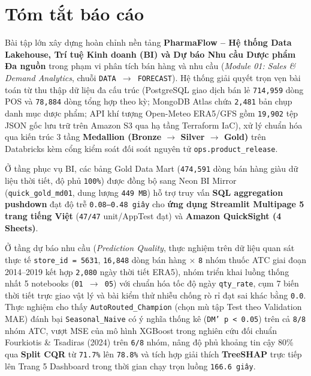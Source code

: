 \chapter*{Tóm tắt báo cáo}

Bài tập lớn xây dựng hoàn chỉnh nền tảng \textbf{PharmaFlow -- Hệ thống Data Lakehouse, Trí tuệ Kinh doanh (BI) và Dự báo Nhu cầu Dược phẩm Đa nguồn} trong phạm vi phân tích bán hàng và nhu cầu (\textit{Module 01: Sales \& Demand Analytics}, chuỗi \texttt{DATA $\rightarrow$ FORECAST}). Hệ thống giải quyết trọn vẹn bài toán từ thu thập dữ liệu đa cấu trúc (PostgreSQL giao dịch bán lẻ \texttt{714,959} dòng POS và \texttt{78,884} dòng tổng hợp theo kỳ; MongoDB Atlas chứa \texttt{2,481} bản chụp danh mục dược phẩm; API khí tượng Open-Meteo ERA5/GFS gồm \texttt{19,902} tệp JSON gốc lưu trữ trên Amazon S3 qua hạ tầng Terraform IaC), xử lý chuẩn hóa qua kiến trúc 3 tầng \textbf{Medallion (Bronze $\rightarrow$ Silver $\rightarrow$ Gold)} trên Databricks kèm cổng kiểm soát đối soát nguyên tử \texttt{ops.product\_release}.

Ở tầng phục vụ BI, các bảng Gold Data Mart (\texttt{474,591} dòng bán hàng giàu dữ liệu thời tiết, độ phủ \texttt{100\%}) được đồng bộ sang Neon BI Mirror (\texttt{quick\_gold\_md01}, dung lượng \texttt{449 MB}) hỗ trợ truy vấn \textbf{SQL aggregation pushdown} đạt độ trễ \texttt{0.08--0.48 giây} cho \textbf{ứng dụng Streamlit Multipage 5 trang tiếng Việt} (\texttt{47/47} unit/AppTest đạt) và \textbf{Amazon QuickSight (4 Sheets)}.

Ở tầng dự báo nhu cầu (\textit{Prediction Quality}, thực nghiệm trên dữ liệu quan sát thực tế \texttt{store\_id = 5631}, \texttt{16,848} dòng bán hàng $\times$ \texttt{8} nhóm thuốc ATC giai đoạn 2014--2019 kết hợp \texttt{2,080} ngày thời tiết ERA5), nhóm triển khai luồng thống nhất 5 notebooks (\texttt{01 $\rightarrow$ 05}) với chuẩn hóa tốc độ ngày \texttt{qty\_rate}, cụm 7 biến thời tiết trực giao vật lý và bài kiểm thử nhiễu chống rò rỉ đạt sai khác bằng \texttt{0.0}. Thực nghiệm cho thấy \texttt{AutoRouted\_Champion} (chọn mù tập Test theo Validation MAE) đánh bại \texttt{Seasonal\_Naive} có ý nghĩa thống kê (\texttt{DM' p < 0.05}) trên cả \texttt{8/8} nhóm ATC, vượt MSE của mô hình XGBoost trong nghiên cứu đối chuẩn Fourkiotis \& Tsadiras (2024) trên \texttt{6/8} nhóm, nâng độ phủ khoảng tin cậy 80\% qua \textbf{Split CQR} từ \texttt{71.7\%} lên \texttt{78.8\%} và tích hợp giải thích \textbf{TreeSHAP} trực tiếp lên Trang 5 Dashboard trong thời gian chạy trọn luồng \texttt{166.6 giây}.
